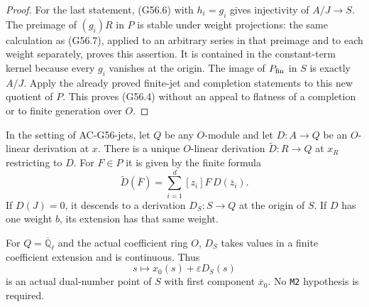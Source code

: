 \begin{proof}
For the last statement, (G56.6) with $h_i=g_i$
gives injectivity of $A/J\to S$.
The preimage of $(g_i)R$ in $P$ is stable under
weight projections: the same calculation as
(G56.7), applied to an arbitrary series in that
preimage and to each weight separately, proves
this assertion.  It is contained in the
constant-term kernel because every $g_i$ vanishes
at the origin.  The image of $P_{\rm fin}$ in
$S$ is exactly $A/J$.
Apply the already proved finite-jet and completion
statements to this new quotient of $P$.
This proves (G56.4) without an appeal to flatness
of a completion or to finite generation over $O$.
\end{proof}

\begin{lemma}
\label{AC-G56-der}
In the setting of AC-G56-jets, let $Q$ be any
$O$-module and let $D:A\to Q$ be an $O$-linear
derivation at $x$.
There is a unique $O$-linear derivation
$\widetilde D:R\to Q$ at $x_R$ restricting to $D$.
For $F\in P$ it is given by the finite formula
\[
       \widetilde D(\overline F)
           =\sum_{i=1}^d [z_i]F\,D(\overline z_i).
                                                               \tag{G56.8}
\]
If $D(J)=0$, it descends to a derivation
$D_S:S\to Q$ at the origin of $S$.
If $D$ has one weight $b$, its extension has that
same weight.

For $Q=\overline{\mathbb Q}_\ell$ and the actual
coefficient ring $O$, $D_S$ takes values in a
finite coefficient extension and is continuous.
Thus
\[
             s\longmapsto x_0(s)+\varepsilon D_S(s)
                                                               \tag{G56.9}
\]
is an actual dual-number point of $S$ with
first component $\overline{x}_0$.
No \texttt{M2} hypothesis is required.
\end{lemma}

